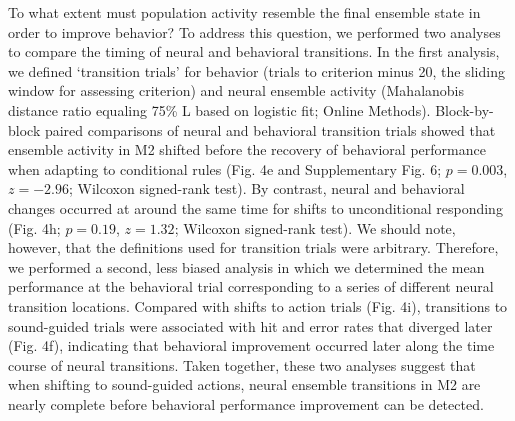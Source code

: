 To what extent must population activity resemble the final ensemble state in order to improve behavior? To address this question, we performed two analyses to compare the timing of neural and behavioral transitions. In the first analysis, we defined `transition trials' for behavior (trials to criterion minus 20, the sliding window for assessing criterion) and neural ensemble activity (Mahalanobis distance ratio equaling 75\% L based on logistic fit; Online Methods). Block-by-block paired comparisons of neural and behavioral transition trials showed that ensemble activity in M2 shifted before the recovery of behavioral performance when adapting to conditional rules (Fig. 4e and Supplementary Fig. 6; $p = 0.003$, $z = -2.96$; Wilcoxon signed-rank test). By contrast, neural and behavioral changes occurred at around the same time for shifts to unconditional responding (Fig. 4h; $p = 0.19$, $z = 1.32$; Wilcoxon signed-rank test). We should note, however, that the definitions used for transition trials were arbitrary. Therefore, we performed a second, less biased analysis in which we determined the mean performance at the behavioral trial corresponding to a series of different neural transition locations. Compared with shifts to action trials (Fig. 4i), transitions to sound-guided trials were associated with hit and error rates that diverged later (Fig. 4f), indicating that behavioral improvement occurred later along the time course of neural transitions. Taken together, these two analyses suggest that when shifting to sound-guided actions, neural ensemble transitions in M2 are nearly complete before behavioral performance improvement can be detected.

